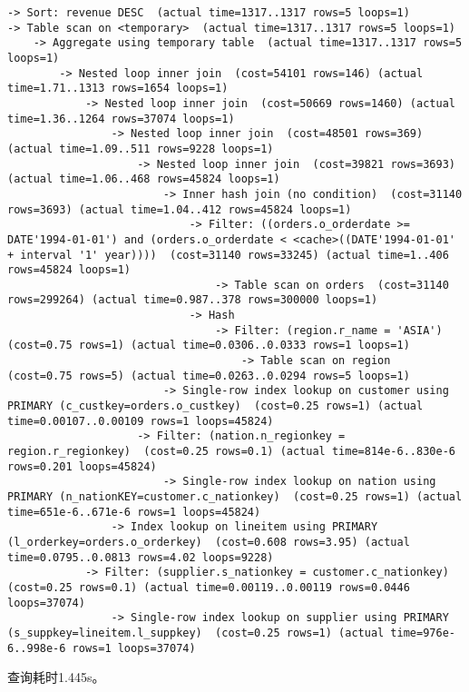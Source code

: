 \documentclass{article}
\begin{document}
\begin{lstlisting}
-> Sort: revenue DESC  (actual time=1317..1317 rows=5 loops=1)
-> Table scan on <temporary>  (actual time=1317..1317 rows=5 loops=1)
    -> Aggregate using temporary table  (actual time=1317..1317 rows=5 loops=1)
        -> Nested loop inner join  (cost=54101 rows=146) (actual time=1.71..1313 rows=1654 loops=1)
            -> Nested loop inner join  (cost=50669 rows=1460) (actual time=1.36..1264 rows=37074 loops=1)
                -> Nested loop inner join  (cost=48501 rows=369) (actual time=1.09..511 rows=9228 loops=1)
                    -> Nested loop inner join  (cost=39821 rows=3693) (actual time=1.06..468 rows=45824 loops=1)
                        -> Inner hash join (no condition)  (cost=31140 rows=3693) (actual time=1.04..412 rows=45824 loops=1)
                            -> Filter: ((orders.o_orderdate >= DATE'1994-01-01') and (orders.o_orderdate < <cache>((DATE'1994-01-01' + interval '1' year))))  (cost=31140 rows=33245) (actual time=1..406 rows=45824 loops=1)
                                -> Table scan on orders  (cost=31140 rows=299264) (actual time=0.987..378 rows=300000 loops=1)
                            -> Hash
                                -> Filter: (region.r_name = 'ASIA')  (cost=0.75 rows=1) (actual time=0.0306..0.0333 rows=1 loops=1)
                                    -> Table scan on region  (cost=0.75 rows=5) (actual time=0.0263..0.0294 rows=5 loops=1)
                        -> Single-row index lookup on customer using PRIMARY (c_custkey=orders.o_custkey)  (cost=0.25 rows=1) (actual time=0.00107..0.00109 rows=1 loops=45824)
                    -> Filter: (nation.n_regionkey = region.r_regionkey)  (cost=0.25 rows=0.1) (actual time=814e-6..830e-6 rows=0.201 loops=45824)
                        -> Single-row index lookup on nation using PRIMARY (n_nationKEY=customer.c_nationkey)  (cost=0.25 rows=1) (actual time=651e-6..671e-6 rows=1 loops=45824)
                -> Index lookup on lineitem using PRIMARY (l_orderkey=orders.o_orderkey)  (cost=0.608 rows=3.95) (actual time=0.0795..0.0813 rows=4.02 loops=9228)
            -> Filter: (supplier.s_nationkey = customer.c_nationkey)  (cost=0.25 rows=0.1) (actual time=0.00119..0.00119 rows=0.0446 loops=37074)
                -> Single-row index lookup on supplier using PRIMARY (s_suppkey=lineitem.l_suppkey)  (cost=0.25 rows=1) (actual time=976e-6..998e-6 rows=1 loops=37074)

\end{lstlisting}

查询耗时1.445s。
\end{document}
